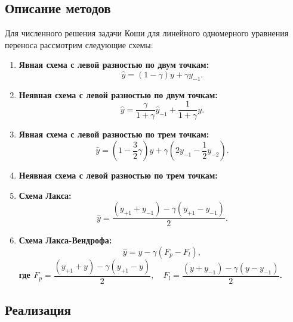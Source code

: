 \documentclass[12pt, a4paper]{article}
\begin{document}
\subsection{Описание методов}
Для численного решения задачи Коши для линейного одномерного уравнения переноса рассмотрим следующие схемы:

\begin{enumerate}
	
	\item \bf{Явная схема с левой разностью по двум точкам}:
	\begin{equation*}
		\widehat{y} = (1 - \gamma) y + \gamma y_{-1}.
	\end{equation*}
	
	\item \bf{Неявная схема с левой разностью по двум точкам}:
	\begin{equation*}
		\widehat{y} = \dfrac{\gamma}{1 + \gamma} \widehat{y}_{-1} + \dfrac{1}{1 + \gamma} y .
	\end{equation*}
	
	\item \bf{Явная схема с левой разностью по трем точкам}:
	\begin{equation*}
		\widehat{y} = (1 - \frac{3}{2}\gamma) y + \gamma(2y_{-1} - \frac{1}{2}y_{-2}) .
	\end{equation*}
	
	\item \bf{Неявная схема с левой разностью по трем точкам}:
	\begin{equation*}
	\end{equation*}
	
	\item \bf{Схема Лакса}:
	\begin{equation*}
		\widehat{y} = \dfrac{(y_{+1} + y_{-1}) - \gamma(y_{+1} - y_{-1})}{2} .
	\end{equation*}
	
	\item \bf{Схема Лакса-Вендрофа}:
	\begin{equation*}
		\widehat{y} = y - \gamma(F_p - F_l),
	\end{equation*}
	где $ F_p = \dfrac{(y_{+1} + y) - \gamma (y_{+1} - y)}{2}, \quad F_l = \dfrac{(y + y_{-1}) - \gamma (y - y_{-1})}{2} $.
\end{enumerate}

\subsection{Реализация}
\end{document}
